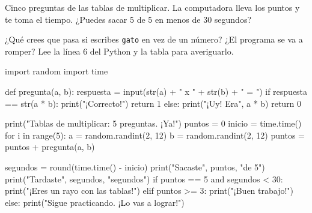 
Cinco preguntas de las tablas de multiplicar. La computadora lleva los puntos y te toma el tiempo. ¿Puedes sacar 5 de 5 en menos de 30 segundos?

\begin{center}
\begin{scratch}
\end{scratch}
\end{center}

\begin{think}
¿Qué crees que pasa si escribes \texttt{gato} en vez de un número? ¿El programa se va a romper? Lee la línea 6 del Python y la tabla para averiguarlo.
\end{think}

\begin{typethis}
import random
import time

def pregunta(a, b):
    respuesta = input(str(a) + " x " + str(b) + " = ")
    if respuesta == str(a * b):
        print("¡Correcto!")
        return 1
    else:
        print("¡Uy! Era", a * b)
        return 0

print("Tablas de multiplicar: 5 preguntas. ¡Ya!")
puntos = 0
inicio = time.time()
for i in range(5):
    a = random.randint(2, 12)
    b = random.randint(2, 12)
    puntos = puntos + pregunta(a, b)

segundos = round(time.time() - inicio)
print("Sacaste", puntos, "de 5")
print("Tardaste", segundos, "segundos")
if puntos == 5 and segundos < 30:
    print("¡Eres un rayo con las tablas!")
elif puntos >= 3:
    print("¡Buen trabajo!")
else:
    print("Sigue practicando. ¡Lo vas a lograr!")
\end{typethis}

